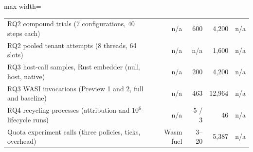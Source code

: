 \begin{table}[t]
\begin{adjustbox}{max width=\textwidth}
\begin{tabular}{lrrrr}
RQ2 compound trials (7 configurations, 40 steps each) & n/a & 600 & 4,200 & n/a \\
RQ2 pooled tenant attempts (8 threads, 64 slots) & n/a & n/a & 1,600 & n/a \\
RQ3 host-call samples, Rust embedder (null, host, native) & n/a & 200 & 4,200 & n/a \\
RQ3 WASI invocations (Preview 1 and 2, full and baseline) & n/a & 463 & 12,964 & n/a \\
RQ4 recycling processes (attribution and $10^6$-lifecycle runs) & n/a & 5 / 3 & 46 & n/a \\
Quota experiment calls (three policies, ticks, overhead) & Wasm fuel & 3--20 & 5,387 & n/a \\
\bottomrule
\end{tabular}%
\end{adjustbox}
\end{table}
